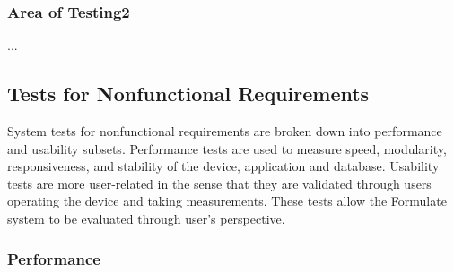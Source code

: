 \documentclass[12pt, titlepage]{article}
\begin{document}
\subsubsection{Area of Testing2}

...

\subsection{Tests for Nonfunctional Requirements}
System tests for nonfunctional requirements are broken down into performance and usability subsets. Performance tests are used to measure speed, modularity, responsiveness, and stability of
the device, application and database. Usability tests are more user-related in the sense that they are validated through users operating the device and taking measurements. These tests allow the Formulate system to be evaluated 
through user's perspective.



\subsubsection{Performance}
		
\end{document}
